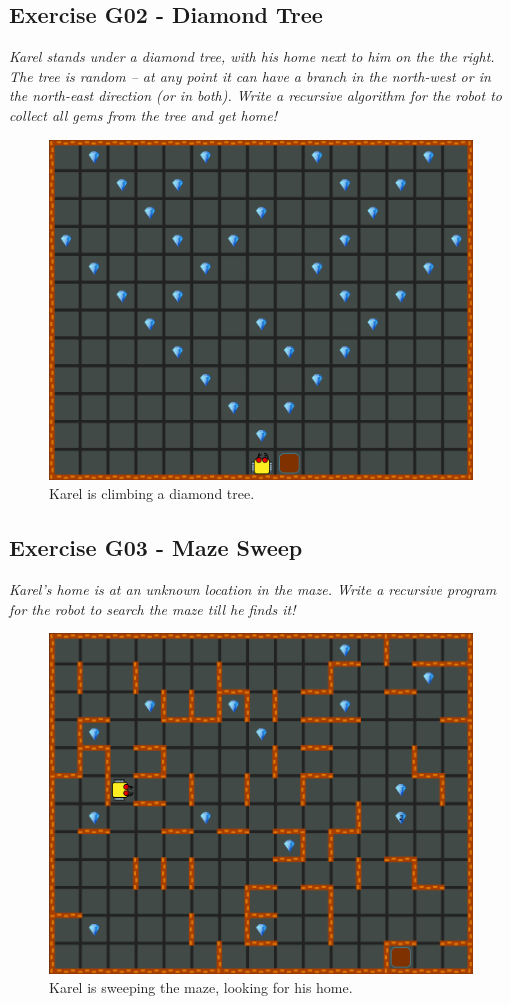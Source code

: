 \documentclass[article,A4,12pt]{llncs}
\begin{document}
{{{{\subsection{Exercise G02 - Diamond Tree}

{\em Karel stands under a diamond tree, with his home next to him on the the right. 
The tree is random -- at any point it can have 
a branch in the north-west or in the north-east direction (or in both). Write a recursive 
algorithm for the robot to collect all gems from the tree and get home!  }

\begin{figure}[!ht]
\begin{center}
\includegraphics[height=0.4\textwidth]{img/g02.png}
\end{center}
\vspace{-4mm}
\caption{Karel is climbing a diamond tree.}
\label{fig:g02}
\vspace{-1cm}
\end{figure}
\newpage
\noindent

\subsection{Exercise G03 - Maze Sweep}

{\em Karel's home is at an unknown location in the maze. Write a recursive program for the robot to search the maze till he finds it! }


\begin{figure}[!ht]
\begin{center}
\includegraphics[height=0.4\textwidth]{img/g03.png}
\end{center}
\vspace{-4mm}
\caption{Karel is sweeping the maze, looking for his home.}
\label{fig:g03}
\end{figure}
\noindent

}}}}
\end{document}
